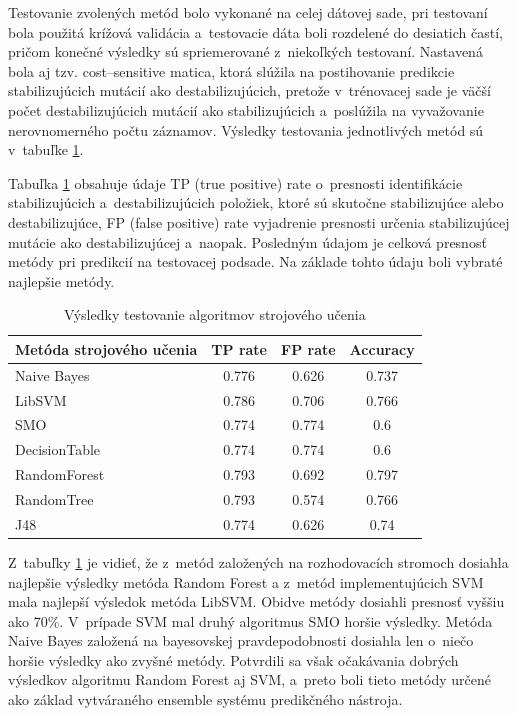 Testovanie zvolených metód bolo vykonané na celej dátovej sade, pri testovaní bola použitá krížová validácia a~testovacie dáta boli rozdelené do desiatich častí, pričom konečné výsledky sú spriemerované z~niekoľkých testovaní. Nastavená bola aj tzv. cost--sensitive matica, ktorá slúžila na postihovanie predikcie stabilizujúcich mutácií ako destabilizujúcich, pretože v~trénovacej sade je väčší počet destabilizujúcich mutácií ako stabilizujúcich a~poslúžila na vyvažovanie nerovnomerného počtu záznamov. Výsledky testovania jednotlivých metód sú v~tabuľke \ref{testovanie}. 

Tabuľka \ref{testovanie} obsahuje údaje TP (true positive) rate o~presnosti identifikácie stabilizujúcich a~destabilizujúcich položiek, ktoré sú skutočne stabilizujúce alebo destabilizujúce, FP (false positive) rate vyjadrenie presnosti určenia stabilizujúcej mutácie ako destabilizujúcej a~naopak. Posledným údajom je celková presnosť metódy pri predikcií na testovacej podsade. Na základe tohto údaju boli vybraté najlepšie metódy.

\begin{table}[H]
	\centering
	\begin{tabular}{ | l | c | c | c| }
		\hline 
		Metóda strojového učenia & TP rate & FP rate & Accuracy \\ \hline
		Naive Bayes & 0.776 & 0.626 & 0.737 \\ \hline
		LibSVM &  0.786   & 0.706   & 0.766  \\ \hline
		SMO & 0.774 & 0.774 & 0.6\\ \hline
		DecisionTable & 0.774 & 0.774 & 0.6\\ \hline
		RandomForest & 0.793 & 0.692 & 0.797\\ \hline
		RandomTree & 0.793 & 0.574 & 0.766\\ \hline
		J48 & 0.774 & 0.626 & 0.74\\ \hline		
	\end{tabular}
	\caption {Výsledky testovanie algoritmov strojového učenia} \label{testovanie} 
\end{table}

Z~tabuľky \ref{testovanie} je vidieť, že z~metód založených na rozhodovacích stromoch dosiahla najlepšie výsledky metóda Random Forest a z~metód implementujúcich SVM mala najlepší výsledok metóda LibSVM. Obidve metódy dosiahli presnosť vyššiu ako 70\%. V~prípade SVM mal druhý algoritmus SMO horšie výsledky. Metóda Naive Bayes založená na bayesovskej pravdepodobnosti dosiahla len o~niečo horšie výsledky ako zvyšné metódy. Potvrdili sa však očakávania dobrých výsledkov algoritmu Random Forest aj SVM, a~preto boli tieto metódy určené ako základ vytváraného ensemble systému predikčného nástroja.

